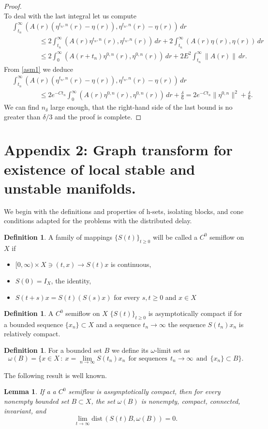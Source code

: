 \documentclass[11pt, leqno]{amsart}
\newtheorem{lem}[thm]{Lemma}
\theoremstyle{definition}
\newtheorem{df}[thm]{Definition}
\begin{document}
\begin{proof}
$$  $$
    To deal with the last integral let us compute    \begin{align*}
    & \int_{t_n}^\infty (A(r)(\eta^{t_n,n}(r)-\eta(r)),\eta^{t_n,n}(r)-\eta(r))\, dr \\
    & \qquad \qquad \leq 2  \int_{t_n}^\infty (A(r)\eta^{t_n,n}(r),\eta^{t_n,n}(r))\, dr + 2\int_{t_n}^\infty (A(r)\eta(r),\eta(r))\, dr \\
    & \qquad \qquad \leq 2  \int_{0}^\infty (A(r+t_n)\eta^{0,n}(r),\eta^{0,n}(r))\, dr + 2E^2\int_{t_n}^\infty \|A(r)\|\, dr .
    \end{align*}
    From \ref{asm1} we deduce
    \begin{align*}
    & \int_{t_n}^\infty (A(r)(\eta^{t_n,n}(r)-\eta(r)),\eta^{t_n,n}(r)-\eta(r))\, dr \\
    & \qquad \qquad \leq 2 e^{-Ct_n} \int_{0}^\infty (A(r)\eta^{0,n}(r),\eta^{0,n}(r))\, dr + \frac{\delta}{6} = 2 e^{-Ct_n} \|\eta^{0,n}\|^2 + \frac{\delta}{6}.
    \end{align*}
    We can find $n_\delta$ large enough, that the right-hand side of the last bound is no greater than $
    \delta/3$ and the proof is complete.
\end{proof}



\section{Appendix 2: Graph transform for existence of local stable and unstable manifolds.}
We begin with the definitions and properties of h-sets, isolating blocks, and cone conditions adapted for the problems with the distributed delay.
\begin{df}
	A family of  mappings $\{ S(t) \}_{t\geq 0}$ will be called a $C^0$ semiflow on $X$ if
	\begin{itemize}
		\item $[0,\infty) \times X \ni (t,x) \to S(t)x$ is continuous,
		\item $S(0) = I_X$, the identity,
		\item $S(t+s)x = S(t)(S(s)x)$ for every $s,t\geq 0$ and $x\in X$
	\end{itemize}
\end{df}	
\begin{df}
	A $C^0$ semiflow on $X$ $\{ S(t) \}_{t\geq 0}$ is asymptotically compact if
	for a bounded sequence $\{ x_n \} \subset  X$ and a sequence $t_n\to \infty$ the sequence  $S(t_n)x_n$ is relatively compact.
\end{df}
\begin{df} \label{df:wB}
	For a bounded set $B$ we define its $\omega$-limit set as
	$$
	\omega(B) = \{ x\in X\, :\ x = \lim_{n\to\infty} S(t_n)x_n\ \ \textrm{for sequences}\ \ t_n\to \infty \ \ \textrm{and} \ \ \{ x_n \}\subset B\}.
	$$
\end{df}
The following result is well known.
\begin{lem}\label{as:com}
	If a a $C^0$ semiflow is assymptotically compact, then for every nonempty bounded set $B\subset X$, the set $\omega(B)$ is nonempty, compact, connected, invariant, and
	$$
	\lim_{t\to\infty}\mathrm{dist}\, (S(t)B, \omega(B)) = 0.
	$$
\end{lem}
\end{document}
